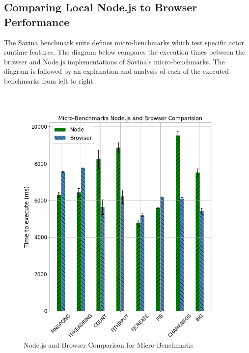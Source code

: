 \documentclass[oneside]{um-fict}
\begin{document}
\subsection{Comparing Local Node.js to Browser Performance}
The Savina benchmark suite defines micro-benchmarks which test specific actor runtime features. The diagram below compares the execution times between the browser and Node.js implementations of Savina's micro-benchmarks. The diagram is followed by an explanation and analysis of each of the executed benchmarks from left to right.
\begin{figure}[H]
    \begin{centering}
        \includegraphics[width=\textwidth]{resources/micro.png}
        \caption{Node.js and Browser Comparison for Micro-Benchmarks}\label{fig:micro}
    \end{centering}
\end{figure}
\end{document}
